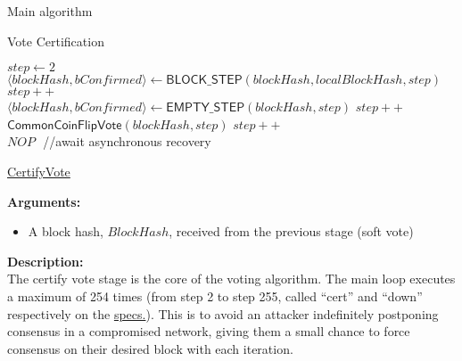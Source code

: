 \documentclass[10pt,a4paper]{article}
\begin{document}
\begin{section}{Main algorithm}
\begin{subsection}{Vote Certification}
\begin{algorithm}[H]
\begin{algorithmic}[H]
        \State $step \gets 2$
            \\
            \State $\langle blockHash, bConfirmed \rangle \gets \mathsf{BLOCK\_STEP}(blockHash, localBlockHash, step)$
            \EndIf
            \State $step++$\\
       
            \State $ \langle blockHash, bConfirmed \rangle \gets \mathsf{EMPTY\_STEP}(blockHash,step)$
            \EndIf
            \State $step++$\\
    
            \State $\mathsf{CommonCoinFlipVote}(blockHash, step)$
            \State $step++$
        \EndWhile \\
        
         \State $NOP$ ${}$ {\hskip 1cm} //await asynchronous recovery
        \EndWhile

        \EndFunction
        \end{algorithmic}
        \caption{\underline{CertifyVote}}
    \end{algorithm}
    
\noindent \textbf{Arguments:}
\begin{itemize}
    \item A block hash, $BlockHash$, received from the previous stage (soft vote)
  \end{itemize}

\noindent \textbf{Description:}\\
The certify vote stage is the core of the voting algorithm.
The main loop executes a maximum of 254 times (from step 2 to step 255, called ``cert'' and ``down'' 
respectively on the \href{https://github.com/algorandfoundation/specs}{specs.}).
This is to avoid an attacker indefinitely postponing consensus in a compromised network, giving them a 
small chance to force consensus on their desired block with each iteration.


\end{subsection}
\end{section}
\end{document}
